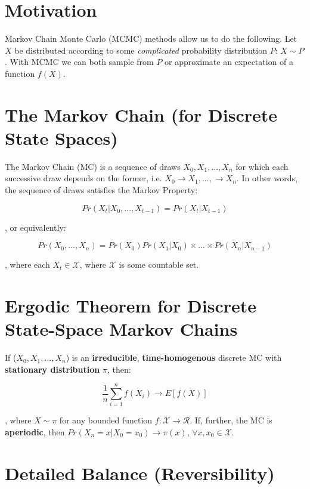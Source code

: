 \documentclass{article}
\begin{document}
	\section*{Motivation}
	Markov Chain Monte Carlo (MCMC) methods allow us to do the following. Let $X$ be
	distributed according to some \emph{complicated} probability distribution
	$P$: $X \sim P$. With MCMC we can both sample from $P$ or approximate
	an expectation of a function $f(X)$. 

	\section*{The Markov Chain (for Discrete State Spaces)}
	The Markov Chain (MC) is a sequence of draws $X_0, X_1, ..., X_n$ for which
	each successive draw depends on the former, i.e. 
	$X_0 \rightarrow X_1, ..., \rightarrow X_n$. 
	In other words, the sequence of draws satisfies the Markov Property:

	\begin{equation}
		Pr(X_t|X_0,...,X_{t-1}) = Pr(X_t|X_{t-1})
	\end{equation}

	\noindent, or equivalently:

	\begin{equation}
		Pr(X_0,...,X_n) = Pr(X_0)Pr(X_1|X_0) \times ... \times Pr(X_n|X_{n-1})
	\end{equation}

	\noindent, where each $X_t \in \mathcal{X}$, where $\mathcal{X}$ is some
	countable set. 

	\section*{Ergodic Theorem for Discrete State-Space Markov Chains}
	If ($X_0,X_1,...,X_n$) is an \textbf{irreducible}, \textbf{time-homogenous} 
	discrete MC with \textbf{stationary distribution} $\pi$, then:

	\begin{equation}
	 	\frac{1}{n}\sum_{i=1}^nf(X_i) \rightarrow E[f(X)]
	 \end{equation}

	 \noindent, where $X \sim \pi$ for any bounded function 
	 $f:\mathcal{X} \rightarrow \mathcal{R}$. If, further, the MC is 
	 \textbf{aperiodic}, then 
	 $Pr(X_n=x|X_0=x_0) \rightarrow \pi(x)$, $\forall x,x_0 \in \mathcal{X}$.

	 \section*{Detailed Balance (Reversibility)}
\end{document}
